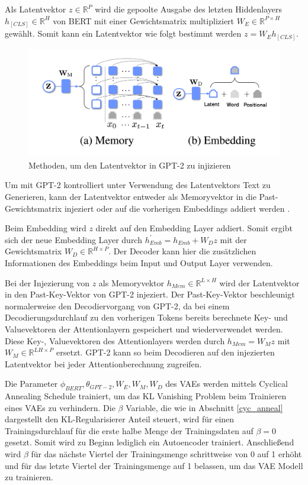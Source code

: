 \pagebreak
Als Latentvektor $z \in \mathbb{R}^P$ wird die gepoolte Ausgabe des letzten Hiddenlayers $h_{[CLS]} \in \mathbb{R}^H$ von BERT mit einer Gewichtsmatrix multipliziert $W_{E} \in \mathbb{R}^{P\times H}$ gewählt. Somit kann ein Latentvektor wie folgt bestimmt werden $z = W_{E}h_{[CLS]}$.

\begin{figure}[h]
    \centering
    \includegraphics[width=\textwidth]{bilder/latent_optimus}
    \caption{Methoden, um den Latentvektor in GPT-2 zu injizieren \citep{DBLP:journals/corr/abs-2004-04092}}
    \label{latent_optimus}
\end{figure}

Um mit GPT-2 kontrolliert unter Verwendung des Latentvektors Text zu Generieren, kann der Latentvektor entweder als Memoryvektor in die Past-Gewichtsmatrix injeziert oder auf die vorherigen Embeddings addiert werden \citep{DBLP:journals/corr/abs-2004-04092}.

Beim Embedding wird $z$ direkt auf den Embedding Layer addiert. Somit ergibt sich der neue Embedding Layer durch $h_{Emb}^{'} = h_{Emb} + W_D z$ mit der Gewichtsmatrix $W_D \in \mathbb{R}^{H \times P}$.
Der Decoder kann hier die zusätzlichen Informationen des Embeddings beim Input und Output Layer verwenden.

Bei der Injezierung von $z$ als Memoryvektor $h_{Mem} \in \mathbb{R}^{L\times H}$ wird der Latentvektor in den Past-Key-Vektor von GPT-2 injeziert. 
Der Past-Key-Vektor beschleunigt normalerweise den Decodiervorgang von GPT-2, da bei einem Decodierungsdurchlauf zu den vorherigen Tokens bereits berechnete Key- und Valuevektoren der Attentionlayern gespeichert und wiederverwendet werden.
Diese Key-, Valuevektoren des Attentionlayers werden durch $h_{Mem} = W_M z$ mit $W_M \in \mathbb{R}^{LH \times P}$ ersetzt. GPT-2 kann so beim Decodieren auf den injezierten Latentvektor bei jeder Attentionberechnung zugreifen.

Die Parameter ${\phi_{BERT}, \theta_{GPT-2}, W_E,W_M,W_D}$ des VAEs werden mittels Cyclical Annealing Schedule \citep{cyc_anneal} trainiert, um das KL Vanishing Problem beim Trainieren eines VAEs zu verhindern.
Die $\beta$ Variable, die wie in Abschnitt \ref{cyc_anneal} dargestellt den KL-Regularisierer Anteil steuert, wird für einen Trainingsdurchlauf für die erste halbe Menge der Trainingsdaten auf $\beta = 0$ gesetzt. Somit wird zu Beginn lediglich ein Autoencoder trainiert. 
Anschließend wird $\beta$ für das nächste Viertel der Trainingsmenge schrittweise von 0 auf 1 erhöht und für das letzte Viertel der Trainingsmenge auf 1 belassen, um das VAE Modell zu trainieren.

